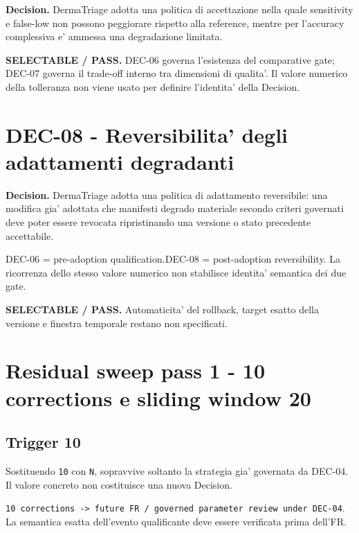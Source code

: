 \documentclass[11pt,a4paper]{article}
\begin{document}
\textbf{Decision.} DermaTriage adotta una politica di accettazione nella quale sensitivity e false-low non possono peggiorare rispetto alla reference, mentre per l'accuracy complessiva e' ammessa una degradazione limitata.

\begin{ddtacore}[title={Disposition}]
\textbf{SELECTABLE / PASS.} DEC-06 governa l'esistenza del comparative gate; DEC-07 governa il trade-off interno tra dimensioni di qualita'. Il valore numerico della tolleranza non viene usato per definire l'identita' della Decision.
\end{ddtacore}

\section{DEC-08 - Reversibilita' degli adattamenti degradanti}
\textbf{Decision.} DermaTriage adotta una politica di adattamento reversibile: una modifica gia' adottata che manifesti degrado materiale secondo criteri governati deve poter essere revocata ripristinando una versione o stato precedente accettabile.

\begin{ddtacheck}[title={Lifecycle split}]
DEC-06 = pre-adoption qualification.\quad DEC-08 = post-adoption reversibility. La ricorrenza dello stesso valore numerico non stabilisce identita' semantica dei due gate.
\end{ddtacheck}

\begin{ddtacore}[title={Disposition}]
\textbf{SELECTABLE / PASS.} Automaticita' del rollback, target esatto della versione e finestra temporale restano non specificati.
\end{ddtacore}

\section{Residual sweep pass 1 - 10 corrections e sliding window 20}
\subsection{Trigger 10}
Sostituendo \texttt{10} con \texttt{N}, sopravvive soltanto la strategia gia' governata da DEC-04. Il valore concreto non costituisce una nuova Decision.

\begin{ddtacore}[title={Routing}]
\texttt{10 corrections -> future FR / governed parameter review under DEC-04}. La semantica esatta dell'evento qualificante deve essere verificata prima dell'FR.
\end{ddtacore}
\end{document}
